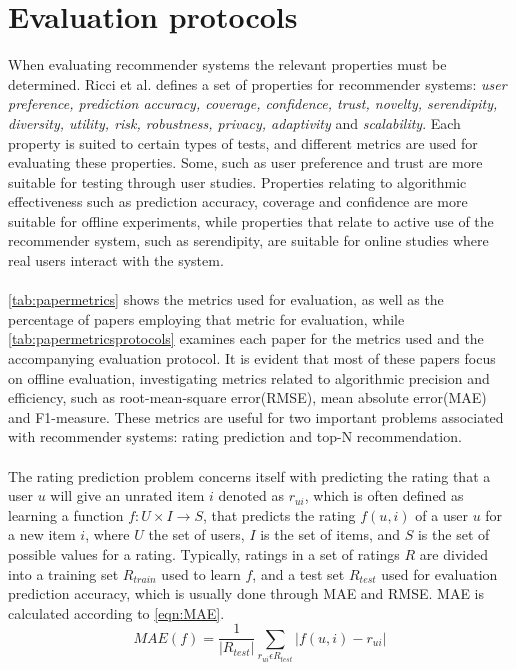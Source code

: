 \section{Evaluation protocols}
When evaluating recommender systems the relevant properties must be determined.
Ricci et al.\cite{RecommenderHandbook2015} defines a set of properties for recommender systems: \textit{user preference, prediction accuracy, coverage, confidence, trust, novelty, serendipity, diversity, utility, risk, robustness, privacy, adaptivity} and \textit{scalability}.
Each property is suited to certain types of tests, and different metrics are used for evaluating these properties.
Some, such as user preference and trust are more suitable for testing through user studies.
Properties relating to algorithmic effectiveness such as prediction accuracy, coverage and confidence are more suitable for offline experiments, while properties that relate to active use of the recommender system, such as serendipity, are suitable for online studies where real users interact with the system.
\\\\
\autoref{tab:papermetrics} shows the metrics used for evaluation, as well as the percentage of papers employing that metric for evaluation, while \autoref{tab:papermetricsprotocols} examines each paper for the metrics used and the accompanying evaluation protocol.
It is evident that most of these papers focus on offline evaluation, investigating metrics related to algorithmic precision and efficiency, such as root-mean-square error(RMSE), mean absolute error(MAE) and F1-measure.
These metrics are useful for two important problems associated with recommender systems: rating prediction and top-N recommendation\cite{RecommenderHandbook2015}.
\\\\
The rating prediction problem concerns itself with predicting the rating that a user $u$ will give an unrated item $i$ denoted as $r_{ui}$, which is often defined as learning a function $f : U \times I \rightarrow S$, that predicts the rating $f(u, i)$ of a user $u$ for a new item $i$, where $U$ the set of users, $I$ is the set of items, and $S$ is the set of possible values for a rating.
Typically, ratings in a set of ratings $R$ are divided into a training set $R_{train}$ used to learn $f$, and a test set $R_{test}$ used for evaluation prediction accuracy, which is usually done through MAE and RMSE.
MAE is calculated according to \autoref{eqn:MAE}.
\begin{equation}
    \label{eqn:MAE}
    MAE(f) = \frac{1}{|R_{test}|} \sum\limits_{r_{ui} \epsilon R_{test}} |f(u,i)-r_{ui}|
\end{equation}
